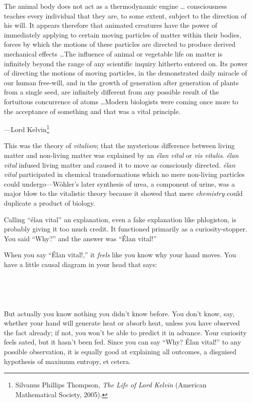 {
 The animal body does not act as a thermodynamic engine \ldots
consciousness teaches every individual that they are, to some extent,
subject to the direction of his will. It appears therefore that
animated creatures have the power of immediately applying to certain
moving particles of matter within their bodies, forces by which the
motions of these particles are directed to produce derived mechanical
effects \ldots The influence of animal or vegetable life on matter is
infinitely beyond the range of any scientific inquiry hitherto entered
on. Its power of directing the motions of moving particles, in the
demonstrated daily miracle of our human free-will, and in the growth of
generation after generation of plants from a single seed, are
infinitely different from any possible result of the fortuitous
concurrence of atoms \ldots Modern biologists were coming once more to
the acceptance of something and that was a vital principle.}

{\raggedleft
 {}---Lord Kelvin\footnote{Silvanus Phillips Thompson, \textit{The Life of Lord Kelvin}
(American Mathematical Society, 2005).}
\par}


\bigskip

{
 This was the theory of \textit{vitalism}; that the mysterious
difference between living matter and non-living matter was explained by
an \textit{élan vital} or \textit{vis vitalis}. \textit{élan vital}
infused living matter and caused it to move as consciously directed.
\textit{élan vital} participated in chemical transformations which no
mere non-living particles could undergo---Wöhler's
later synthesis of urea, a component of urine, was a major blow to the
vitalistic theory because it showed that mere \textit{chemistry} could
duplicate a product of biology.}

{
 Calling ``élan vital'' an
explanation, even a fake explanation like phlogiston, is probably
giving it too much credit. It functioned primarily as a
curiosity-stopper. You said ``Why?''
and the answer was ``Élan vital!''}

{
 When you say ``Élan vital!,''
it \textit{feels} like you know why your hand moves. You have a little
causal diagram in your head that says:}

{
 ~}



{
 ~}

{
 But actually you know nothing you didn't know
before. You don't know, say, whether your hand will
generate heat or absorb heat, unless you have observed the fact
already; if not, you won't be able to predict it in
advance. Your curiosity feels sated, but it hasn't been
fed. Since you can say ``Why? Élan
vital!'' to any possible observation, it is equally
good at explaining all outcomes, a disguised hypothesis of maximum
entropy, et cetera.}

